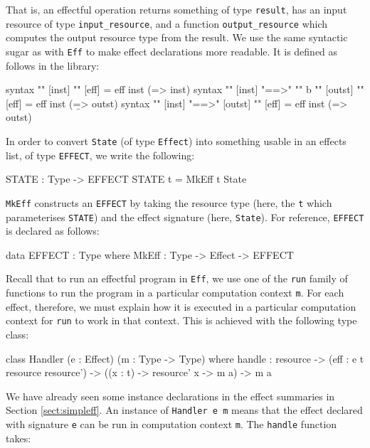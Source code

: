 \noindent
That is, an effectful operation returns something of type \texttt{result},
has an input resource of type \texttt{input\_resource}, and a function
\texttt{output\_resource} which computes the output resource type from
the result. We use the same syntactic sugar as with \texttt{Eff} to make
effect declarations more readable. It is defined as follows in
the \effects{} library:

\begin{code}
syntax "{" [inst] "}" [eff] = eff inst (\result => inst)
syntax "{" [inst] "==>" "{" {b} "}" [outst] "}" [eff] 
       = eff inst (\b => outst)
syntax "{" [inst] "==>" [outst] "}" [eff] = eff inst (\result => outst)
\end{code}

\noindent
In order to convert \texttt{State} (of type \texttt{Effect}) into something
usable in an effects list, of type \texttt{EFFECT}, we write the following:

\begin{code}
STATE : Type -> EFFECT
STATE t = MkEff t State
\end{code}

\noindent
\texttt{MkEff} constructs an \texttt{EFFECT} by taking the resource type
(here, the \texttt{t} which parameterises \texttt{STATE})
and the effect signature (here, \texttt{State}). For reference,
\texttt{EFFECT} is declared as follows:

\begin{code}
data EFFECT : Type where
     MkEff : Type -> Effect -> EFFECT
\end{code}

\noindent
Recall that to run an effectful program in \texttt{Eff}, we use one of the
\texttt{run} family of functions to run the program in a particular
computation context \texttt{m}. For each effect, therefore, we must explain
how it is executed in a particular computation context for \texttt{run} to
work in that context. This is achieved with the following type class:

\begin{code}
class Handler (e : Effect) (m : Type -> Type) where
      handle : resource -> (eff : e t resource resource') -> 
               ((x : t) -> resource' x -> m a) -> m a
\end{code}

\noindent
We have already seen some instance declarations 
in the effect summaries in Section \ref{sect:simpleff}. An instance of
\texttt{Handler e m} means that the effect declared with signature \texttt{e}
can be run in computation context \texttt{m}. The \texttt{handle} function
takes:

